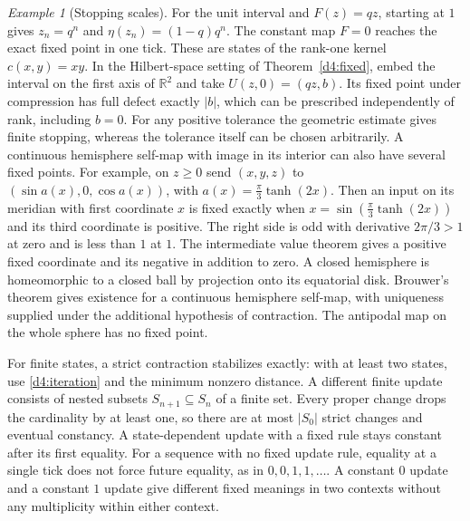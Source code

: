 \documentclass[11pt,reqno]{amsart}
\theoremstyle{definition}
\theoremstyle{remark}
\newtheorem{example}[theorem]{Example}
\numberwithin{equation}{section}
\begin{document}
\begin{example}[Stopping scales]\label{d4:stopping}
For the unit interval and \(F(z)=qz\), starting at \(1\) gives
\(z_n=q^n\) and \(\eta(z_n)=(1-q)q^n\). The constant map \(F=0\)
reaches the exact fixed point in one tick. These are states of the
rank-one kernel \(c(x,y)=xy\). In the Hilbert-space setting of
Theorem~\ref{d4:fixed}, embed the interval on the first axis of
\(\mathbb R^2\) and take \(U(z,0)=(qz,b)\). Its fixed point under
compression has full defect exactly \(|b|\), which can be prescribed
independently of rank, including \(b=0\). For any positive tolerance
the geometric estimate gives finite stopping, whereas the tolerance
itself can be chosen arbitrarily. A continuous hemisphere self-map with image in its
interior can also have several fixed points. For example, on \(z\ge0\) send \((x,y,z)\) to
\((\sin a(x),0,\cos a(x))\), with \(a(x)=\frac{\pi}{3}\tanh(2x)\).
Then an input on its meridian with first coordinate \(x\) is fixed
exactly when \(x=\sin(\frac{\pi}{3}\tanh(2x))\) and its third coordinate
is positive. The right side is odd with derivative \(2\pi/3>1\) at
zero and is less than \(1\) at \(1\). The intermediate value theorem
gives a positive fixed coordinate and its negative in addition to zero.
A closed hemisphere is homeomorphic to a closed ball by projection
onto its equatorial disk. Brouwer's theorem \cite{d4-brouwer} gives existence for a continuous
hemisphere self-map, with uniqueness supplied under the additional
hypothesis of contraction. The antipodal map on the whole sphere has
no fixed point.

For finite states, a strict contraction stabilizes exactly: with at
least two states, use \eqref{d4:iteration} and the minimum nonzero
distance. A different finite update consists of nested subsets
\(S_{n+1}\subseteq S_n\) of a finite set. Every proper change drops the
cardinality by at least one, so there are at most \(|S_0|\) strict changes
and eventual constancy. A state-dependent update with a fixed rule
stays constant after its first equality. For a sequence with no fixed
update rule, equality at a single tick does not force future equality,
as in \(0,0,1,1,\ldots\). A constant \(0\) update and a constant \(1\)
update give different fixed meanings in two contexts without any
multiplicity within either context.
\end{example}
\end{document}
